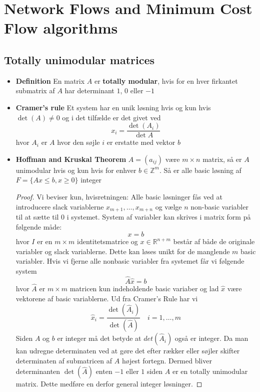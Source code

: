 \section{Network Flows and Minimum Cost Flow algorithms}
\subsection{Totally unimodular matrices}
\begin{itemize}
	\item \textbf{Definition} En matrix $A$ er \textbf{totally modular}, hvis for en hver firkantet submatrix af $A$ har determinant $1$, $0$ eller $-1$  
  \item \textbf{Cramer's rule} Et system har en unik løsning hvis og kun hvis $\det(A) \neq 0$ og i det tilfælde er det givet ved
  \begin{equation*}
    x_i = \frac{\det{(A_i)}}{\det{A}}
  \end{equation*}
  hvor $A_i$ er $A$ hvor den søjle $i$ er erstatte med vektor $b$
  \item \textbf{Hoffman and Kruskal Theorem} $A=(a_{ij})$ være $m \times n$ matrix, så er $A$ unimodular hvis og kun hvis for enhver $b \in \mathbb Z^m$. Så er alle basic løsning af $F=\{Ax \leq b, x \geq 0\}$ integer
  \begin{proof} 
    Vi beviser kun, hvisretningen: Alle basic løsninger fås ved at introducere slack variablerne $x_{m+1}, \dots, x_{m+n}$ og vælge $n$ non-basic variabler til at sætte til 0 i systemet. System af variabler kan skrives i matrix form på følgende måde:
    \begin{equation*}
      [A \quad I] x = b
    \end{equation*}
    hvor $I$ er en $m \times m$ identitetsmatrice og $x \in \mathbb R^{n+m}$ består af både de originale variabler og slack variablerne. Dette kan løses unikt for de manglende $m$ basic variabler. Hvis vi fjerne alle nonbasic variabler fra systemet får vi følgende system
    \begin{equation*}
      \hat A \hat x = b
    \end{equation*}
    hvor $\hat A$ er $m \times m$ matricen kun indeholdende basic variaber og lad $\hat x$ være vektorene af basic variablerne. Ud fra Cramer's Rule har vi 
    \begin{equation*}
      \hat x_i = \frac{\det(\hat A_i)}{\det(\hat A)} \quad i=1,\dots,m
    \end{equation*}
    Siden $A$ og $b$ er integer må det betyde at $det(\hat A_i)$ også er integer. Da man kan udregne determinaten ved at gøre det efter rækker eller søjler skifter determinaten af submatricen af $A$ højest fortegn. Dermed bliver determinanten $\det(\hat A)$ enten $-1$ eller $1$ siden $A$ er en totally unimodular matrix. Dette medføre en derfor general integer løsninger. 


\end{proof}
\end{itemize}

